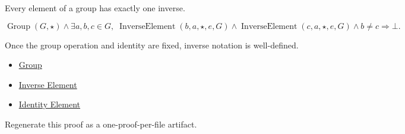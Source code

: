 \begin{remark*}
Every element of a group has exactly one inverse.
\end{remark*}

\begin{remark*}
\[
\operatorname{Group}(G,\star)
\land
\exists a,b,c\in G,\;
\operatorname{InverseElement}(b,a,\star,e,G)
\land
\operatorname{InverseElement}(c,a,\star,e,G)
\land b\neq c
\Longrightarrow \bot.
\]
\end{remark*}

\begin{remark*}[Interpretation]
Once the group operation and identity are fixed, inverse notation is
well-defined.
\end{remark*}

\begin{dependencies}
\begin{itemize}
  \item \hyperref[def:algebraic-group]{Group}
  \item \hyperref[def:inverse-element]{Inverse Element}
  \item \hyperref[def:identity-element]{Identity Element}
\end{itemize}
\end{dependencies}

\begin{remark*}
Regenerate this proof as a one-proof-per-file artifact.
\end{remark*}
